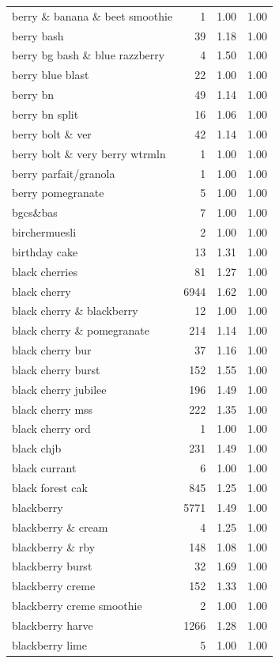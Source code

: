 \begin{table}
\begin{tabular}{lrrr}
berry \& banana \& beet smoothie & 1 & 1.00 & 1.00 \\
berry bash & 39 & 1.18 & 1.00 \\
berry bg bash \& blue razzberry & 4 & 1.50 & 1.00 \\
berry blue blast & 22 & 1.00 & 1.00 \\
berry bn & 49 & 1.14 & 1.00 \\
berry bn split & 16 & 1.06 & 1.00 \\
berry bolt \& ver & 42 & 1.14 & 1.00 \\
berry bolt \& very berry wtrmln & 1 & 1.00 & 1.00 \\
berry parfait/granola & 1 & 1.00 & 1.00 \\
berry pomegranate & 5 & 1.00 & 1.00 \\
bgcs\&bas & 7 & 1.00 & 1.00 \\
birchermuesli & 2 & 1.00 & 1.00 \\
birthday cake & 13 & 1.31 & 1.00 \\
black cherries & 81 & 1.27 & 1.00 \\
black cherry & 6944 & 1.62 & 1.00 \\
black cherry \& blackberry & 12 & 1.00 & 1.00 \\
black cherry \& pomegranate & 214 & 1.14 & 1.00 \\
black cherry bur & 37 & 1.16 & 1.00 \\
black cherry burst & 152 & 1.55 & 1.00 \\
black cherry jubilee & 196 & 1.49 & 1.00 \\
black cherry mss & 222 & 1.35 & 1.00 \\
black cherry ord & 1 & 1.00 & 1.00 \\
black chjb & 231 & 1.49 & 1.00 \\
black currant & 6 & 1.00 & 1.00 \\
black forest cak & 845 & 1.25 & 1.00 \\
blackberry & 5771 & 1.49 & 1.00 \\
blackberry \& cream & 4 & 1.25 & 1.00 \\
blackberry \& rby & 148 & 1.08 & 1.00 \\
blackberry burst & 32 & 1.69 & 1.00 \\
blackberry creme & 152 & 1.33 & 1.00 \\
blackberry creme smoothie & 2 & 1.00 & 1.00 \\
blackberry harve & 1266 & 1.28 & 1.00 \\
blackberry lime & 5 & 1.00 & 1.00 \\

\end{tabular}
\end{table}
